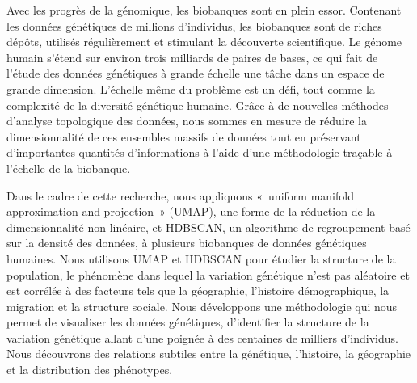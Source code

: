 Avec les progrès de la génomique, les biobanques sont en plein essor. Contenant les données génétiques de millions d'individus, les biobanques sont de riches dépôts, utilisés régulièrement et stimulant la découverte scientifique. Le génome humain s'étend sur environ trois milliards de paires de bases, ce qui fait de l'étude des données génétiques à grande échelle une tâche dans un espace de grande dimension. L'échelle même du problème est un défi, tout comme la complexité de la diversité génétique humaine. Grâce à de nouvelles méthodes d'analyse topologique des données, nous sommes en mesure de réduire la dimensionnalité de ces ensembles massifs de données tout en préservant d'importantes quantités d'informations à l'aide d'une méthodologie traçable à l'échelle de la biobanque.

Dans le cadre de cette recherche, nous appliquons «~uniform manifold approximation and projection~» (UMAP), une forme de la réduction de la dimensionnalité non linéaire, et HDBSCAN, un algorithme de regroupement basé sur la densité des données, à plusieurs biobanques de données génétiques humaines. Nous utilisons UMAP et HDBSCAN pour étudier la structure de la population, le phénomène dans lequel la variation génétique n'est pas aléatoire et est corrélée à des facteurs tels que la géographie, l'histoire démographique, la migration et la structure sociale. Nous développons une méthodologie qui nous permet de visualiser les données génétiques, d'identifier la structure de la variation génétique allant d'une poignée à des centaines de milliers d'individus. Nous découvrons des relations subtiles entre la génétique, l'histoire, la géographie et la distribution des phénotypes.